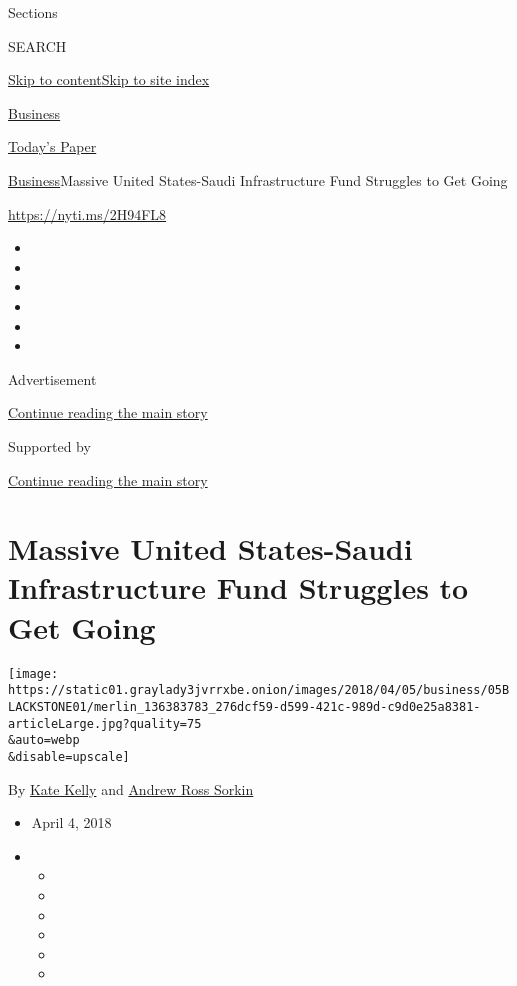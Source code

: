 Sections

SEARCH

\protect\hyperlink{site-content}{Skip to
content}\protect\hyperlink{site-index}{Skip to site index}

\href{https://www.nytimes3xbfgragh.onion/section/business}{Business}

\href{https://myaccount.nytimes3xbfgragh.onion/auth/login?response_type=cookie\&client_id=vi}{}

\href{https://www.nytimes3xbfgragh.onion/section/todayspaper}{Today's
Paper}

\href{/section/business}{Business}\textbar{}Massive United States-Saudi
Infrastructure Fund Struggles to Get Going

\url{https://nyti.ms/2H94FL8}

\begin{itemize}
\item
\item
\item
\item
\item
\item
\end{itemize}

Advertisement

\protect\hyperlink{after-top}{Continue reading the main story}

Supported by

\protect\hyperlink{after-sponsor}{Continue reading the main story}

\hypertarget{massive-united-states-saudi-infrastructure-fund-struggles-to-get-going}{%
\section{Massive United States-Saudi Infrastructure Fund Struggles to
Get
Going}\label{massive-united-states-saudi-infrastructure-fund-struggles-to-get-going}}

\texttt{[image: https://static01.graylady3jvrrxbe.onion/images/2018/04/05/business/05BLACKSTONE01/merlin\_136383783\_276dcf59-d599-421c-989d-c9d0e25a8381-articleLarge.jpg?quality=75\\\&auto=webp\\\&disable=upscale]}

By \href{https://www.nytimes3xbfgragh.onion/by/kate-kelly}{Kate Kelly}
and
\href{http://www.nytimes3xbfgragh.onion/by/andrew-ross-sorkin}{Andrew
Ross Sorkin}

\begin{itemize}
\item
  April 4, 2018
\item
  \begin{itemize}
  \item
  \item
  \item
  \item
  \item
  \item
  \end{itemize}
\end{itemize}

